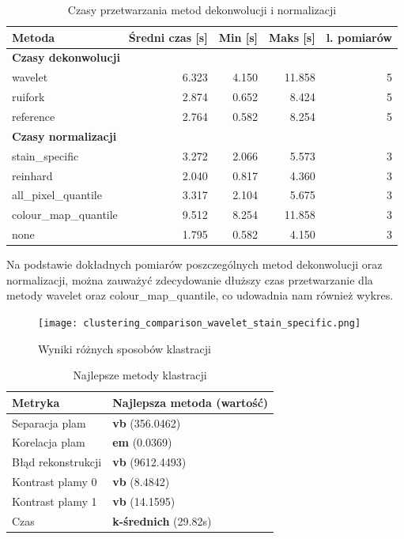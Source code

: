 \documentclass{article}
\begin{document}
\begin{table}[H]
\centering
\label{tab:czasy_przetwarzania}
\begin{tabular}{l r r r r}
\toprule
\textbf{Metoda} & \textbf{Średni czas [s]} & \textbf{Min [s]} & \textbf{Maks [s]} & \textbf{l. pomiarów} \\
\midrule
\multicolumn{5}{l}{\textbf{Czasy dekonwolucji}} \\
\midrule
wavelet     & 6.323 & 4.150 & 11.858 & 5 \\
ruifork     & 2.874 & 0.652 &  8.424 & 5 \\
reference  & 2.764 & 0.582 &  8.254 & 5 \\
\midrule
\multicolumn{5}{l}{\textbf{Czasy normalizacji}} \\
\midrule
stain\_specific       & 3.272 & 2.066 &  5.573 & 3 \\
reinhard             & 2.040 & 0.817 &  4.360 & 3 \\
all\_pixel\_quantile   & 3.317 & 2.104 &  5.675 & 3 \\
colour\_map\_quantile  & 9.512 & 8.254 & 11.858 & 3 \\
none                 & 1.795 & 0.582 &  4.150 & 3 \\
\bottomrule
\end{tabular}
\caption{Czasy przetwarzania metod dekonwolucji i normalizacji}
\end{table}
Na podstawie dokładnych pomiarów poszczególnych metod dekonwolucji oraz normalizacji, można zauważyć zdecydowanie dłuższy czas przetwarzanie dla metody wavelet oraz colour\_map\_quantile, co udowadnia nam również wykres.
\newpage
\begin{figure}
    \centering
    \texttt{[image: clustering\_comparison\_wavelet\_stain\_specific.png]}
    \caption{Wyniki różnych sposobów klastracji}
    \label{fig:placeholder}
\end{figure}

\begin{table}[h!]
\centering
\label{tab:podsumowanie}
\begin{tabular}{ll}
\toprule
\textbf{Metryka} & \textbf{Najlepsza metoda (wartość)} \\
\midrule
Separacja plam & \textbf{vb} (356.0462) \\
Korelacja plam & \textbf{em} (0.0369) \\
Błąd rekonstrukcji & \textbf{vb} (9612.4493) \\
Kontrast plamy 0 & \textbf{vb} (8.4842) \\
Kontrast plamy 1 & \textbf{vb} (14.1595) \\
Czas & \textbf{k-średnich} (29.82s) \\
\bottomrule
\end{tabular}
\caption{Najlepsze metody klastracji}
\end{table}
\end{document}
